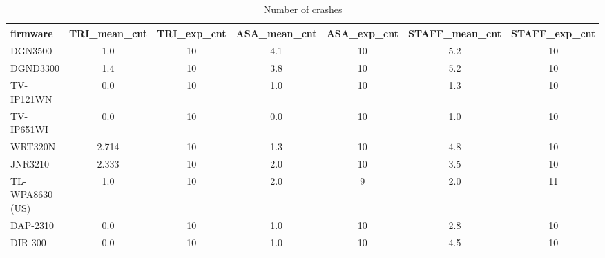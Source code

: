 \begin{table}[ht]
\centering
\renewcommand{\arraystretch}{1.06}
\setlength{\tabcolsep}{4pt}
\begin{tabular}{|l||c|c|c|c|c|c|}
\hline
{\sc firmware} & {\sc TRI\_mean\_cnt} & {\sc TRI\_exp\_cnt} & {\sc ASA\_mean\_cnt} & {\sc ASA\_exp\_cnt} & {\sc STAFF\_mean\_cnt} & {\sc STAFF\_exp\_cnt} \\
\toprule
\hline
DGN3500 & 1.0 & 10 & 4.1 & 10 & 5.2 & 10 \\
\hline
DGND3300 & 1.4 & 10 & 3.8 & 10 & 5.2 & 10 \\
\hline
TV-IP121WN & 0.0 & 10 & 1.0 & 10 & 1.3 & 10 \\
\hline
TV-IP651WI & 0.0 & 10 & 0.0 & 10 & 1.0 & 10 \\
\hline
WRT320N & 2.714 & 10 & 1.3 & 10 & 4.8 & 10 \\
\hline
JNR3210 & 2.333 & 10 & 2.0 & 10 & 3.5 & 10 \\
\hline
TL-WPA8630 (US) & 1.0 & 10 & 2.0 & 9 & 2.0 & 11 \\
\hline
DAP-2310 & 0.0 & 10 & 1.0 & 10 & 2.8 & 10 \\
\hline
DIR-300 & 0.0 & 10 & 1.0 & 10 & 4.5 & 10 \\
\hline
\end{tabular}
\caption{Number of crashes}
\end{table}
